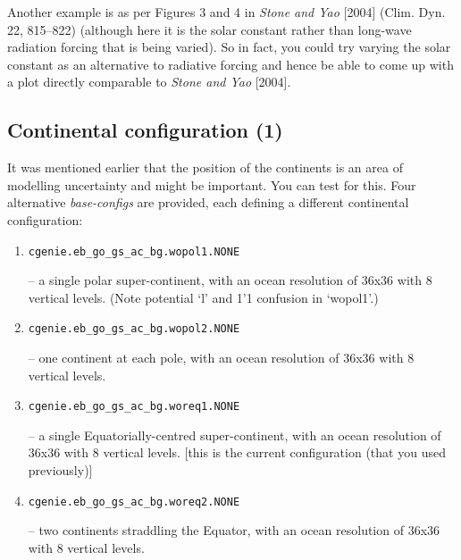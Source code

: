 \documentclass[11pt,fleqn]{book} %
\begin{document}
Another example is as per Figures 3 and 4 in \textit{Stone and Yao} [2004] (Clim. Dyn. 22, 815–822) (although here it is the solar constant rather than long-wave radiation forcing that is being varied). So in fact, you could try varying the solar constant as an alternative to radiative forcing and hence be able to come up with a plot directly comparable to \textit{Stone and Yao} [2004].


\subsection{Continental configuration (1)}

It was mentioned earlier that the position of the continents is an area of modelling uncertainty and might be important. You can test for this. Four alternative \textit{base-configs} are provided, each defining a different continental configuration:

\vspace{1mm}
\begin{enumerate}[noitemsep]
\setlength{\itemindent}{.2in}
\item
\begin{verbatim}
cgenie.eb_go_gs_ac_bg.wopol1.NONE
\end{verbatim}
 – a single polar super-continent, with an ocean resolution of 36x36 with 8 vertical levels. (Note potential ‘l’ and 1’1 confusion in ‘\textsf{\footnotesize wopol1}’.)
\item
\begin{verbatim}
cgenie.eb_go_gs_ac_bg.wopol2.NONE
\end{verbatim}
  – one continent at each pole, with an ocean resolution of 36x36 with 8 vertical levels.
\item
\begin{verbatim}
cgenie.eb_go_gs_ac_bg.woreq1.NONE
\end{verbatim}
  – a single Equatorially-centred super-continent, with an ocean resolution of 36x36 with 8 vertical levels. [this is the current configuration (that you  used previously)]
\item
\begin{verbatim}
cgenie.eb_go_gs_ac_bg.woreq2.NONE
\end{verbatim}
 – two continents straddling the Equator, with an ocean resolution of 36x36 with 8 vertical levels.
\end{enumerate}
\vspace{1mm}
\end{document}
